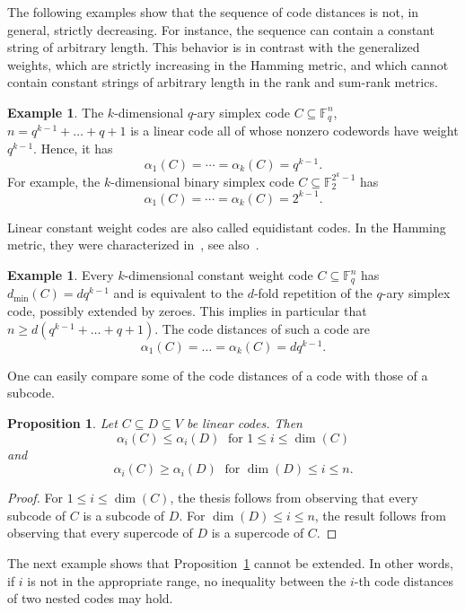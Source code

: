 \documentclass[12pt]{amsart}
\numberwithin{equation}{section}
\newtheorem{proposition}[theorem]{Proposition}
\theoremstyle{definition}
\newtheorem{example}[theorem]{Example}
\newcommand{\FF}{\mathbb{F}}
\begin{document}
The following examples show that the sequence of code distances is not, in general, strictly decreasing. For instance, the sequence can contain a constant string of arbitrary length. This behavior is in contrast with the generalized weights, which are strictly increasing in the Hamming metric, and which cannot contain constant strings of arbitrary length in the rank and sum-rank metrics.

\begin{example}\label{25.03.02}
The $k$-dimensional $q$-ary simplex code $C\subseteq\FF_q^n$, $n=q^{k-1}+\ldots+q+1$ is a linear code all of whose nonzero codewords have weight $q^{k-1}$. Hence, it has
$$\alpha_1(C)=\cdots=\alpha_k(C)=q^{k-1}.$$
For example, the $k$-dimensional binary simplex code $C\subseteq\FF_2^{2^k-1}$ has
$$\alpha_1(C)=\cdots=\alpha_k(C)=2^{k-1}.$$
\end{example}

Linear constant weight codes are also called equidistant codes. In the Hamming metric, they were characterized in~\cite{B84}, see also~\cite{KK23}.

\begin{example}\label{ex:constant}
Every $k$-dimensional constant weight code $C\subseteq\FF_q^n$ has $d_{\min}(C)=dq^{k-1}$ and is equivalent to the $d$-fold repetition of the $q$-ary simplex code, possibly extended by zeroes. This implies in particular that $n\geq d(q^{k-1}+\ldots+q+1)$. The code distances of such a code are
$$\alpha_1(C)=\ldots=\alpha_k(C)=dq^{k-1}.$$
\end{example}

One can easily compare some of the code distances of a code with those of a subcode.

\begin{proposition}\label{alphas of subcodes}
Let $C\subseteq D\subseteq V$ be linear codes. Then $$\alpha_i(C)\leq\alpha_i(D)\; \mbox{ for } 1\leq i\leq \dim(C)$$ and $$\alpha_i(C)\geq\alpha_i(D)\; \mbox{ for } \dim(D)\leq i\leq n.$$  
\end{proposition}

\begin{proof}
For $1\leq i\leq\dim(C)$, the thesis follows from observing that every subcode of $C$ is a subcode of $D$. For $\dim(D)\leq i\leq n$, the result follows from observing that every supercode of $D$ is a supercode of $C$. 
\end{proof}

The next example shows that Proposition~\ref{alphas of subcodes} cannot be extended. In other words, if $i$ is not in the appropriate range, no inequality between the $i$-th code distances of two nested codes may hold.
\end{document}
